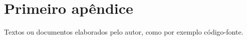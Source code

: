\setcounter{figure}{0}

\chapter{Primeiro apêndice}
\label{apend:codigoMpe}

\vspace{-1.9cm}

Textos ou documentos elaborados pelo autor, como por exemplo código-fonte.


